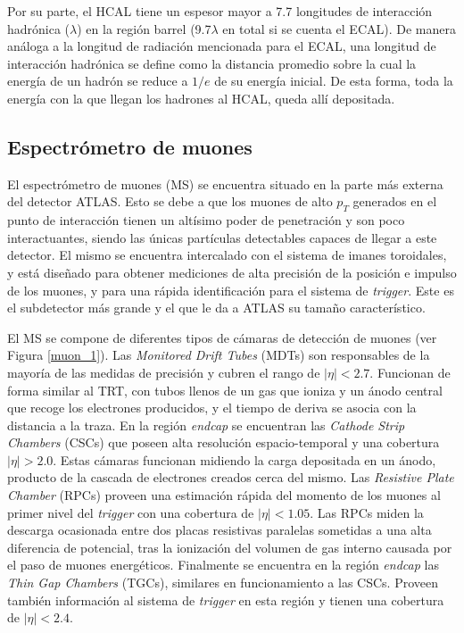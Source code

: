 Por su parte, el HCAL tiene un espesor mayor a 7.7 longitudes de interacción
hadrónica ($\lambda$) en la región barrel (9.7$\lambda$ en total si se cuenta el ECAL). De manera
análoga a la longitud de radiación mencionada para el ECAL, una longitud de
interacción hadrónica se define como la distancia promedio sobre la cual la energía
de un hadrón se reduce a $1/e$ de su energía inicial. De esta forma, toda la energía
con la que llegan los hadrones al HCAL, queda allí depositada.

\subsection{Espectrómetro de muones}


El espectrómetro de muones (MS) se encuentra situado en la parte más externa del detector ATLAS. Esto se debe a que los muones de alto $p_{T}$ generados en el punto de interacción tienen un altísimo poder de penetración y son poco interactuantes, siendo las únicas partículas detectables capaces de llegar a este detector. El mismo se encuentra intercalado con el sistema de imanes toroidales, y está diseñado para obtener mediciones de alta precisión de la posición e impulso de los muones, y para una rápida identificación para el sistema de \textit{trigger}. Este es el subdetector más grande y el que le da a ATLAS su tamaño característico. 

El MS se compone de diferentes tipos de cámaras de detección de muones (ver Figura \ref{muon_1}). Las \textit{Monitored Drift Tubes} (MDTs) son responsables de la mayoría de las medidas de precisión y cubren el rango de $|\eta|<2.7$. Funcionan de forma similar al TRT, con tubos llenos de un gas que ioniza y un ánodo central que recoge los electrones producidos, y el tiempo de deriva se asocia con la distancia a la traza. En la región \textit{endcap} se encuentran las \textit{Cathode Strip Chambers} (CSCs) que poseen alta resolución espacio-temporal y una cobertura $|\eta|>2.0$. Estas cámaras funcionan midiendo la carga depositada en un ánodo, producto de la cascada de electrones creados cerca del mismo. Las \textit{Resistive Plate Chamber} (RPCs) proveen una estimación rápida del momento de los muones al primer nivel del \textit{trigger} con una cobertura de $|\eta|<1.05$. Las RPCs miden la descarga ocasionada entre dos placas resistivas paralelas sometidas a una alta diferencia de potencial, tras la ionización del volumen de gas interno causada por el paso de muones energéticos. Finalmente se encuentra en la región \textit{endcap} las \textit{Thin Gap Chambers} (TGCs), similares en funcionamiento a las CSCs. Proveen también información al sistema de \textit{trigger} en esta región y tienen una cobertura de $|\eta|<2.4$.

